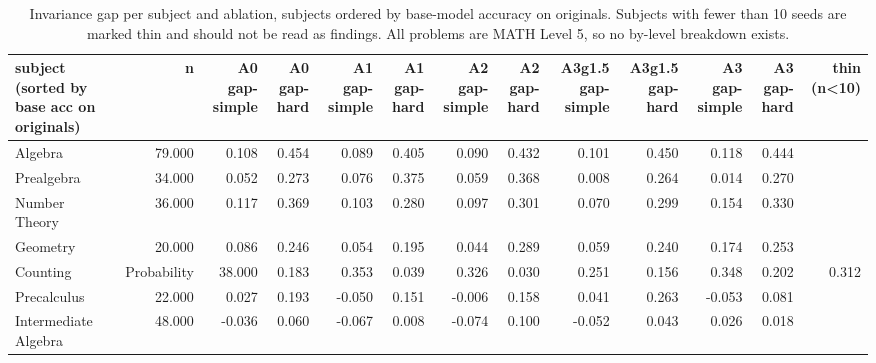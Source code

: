 \begin{table}[t]
\centering
\small
\begin{tabular}{lrrrrrrrrrrrr}
\toprule
subject (sorted by base acc on originals) & n & A0 gap-simple & A0 gap-hard & A1 gap-simple & A1 gap-hard & A2 gap-simple & A2 gap-hard & A3g1.5 gap-simple & A3g1.5 gap-hard & A3 gap-simple & A3 gap-hard & thin (n<10) \\
\midrule
Algebra & 79.000 & 0.108 & 0.454 & 0.089 & 0.405 & 0.090 & 0.432 & 0.101 & 0.450 & 0.118 & 0.444 &  \\
Prealgebra & 34.000 & 0.052 & 0.273 & 0.076 & 0.375 & 0.059 & 0.368 & 0.008 & 0.264 & 0.014 & 0.270 &  \\
Number Theory & 36.000 & 0.117 & 0.369 & 0.103 & 0.280 & 0.097 & 0.301 & 0.070 & 0.299 & 0.154 & 0.330 &  \\
Geometry & 20.000 & 0.086 & 0.246 & 0.054 & 0.195 & 0.044 & 0.289 & 0.059 & 0.240 & 0.174 & 0.253 &  \\
Counting & Probability & 38.000 & 0.183 & 0.353 & 0.039 & 0.326 & 0.030 & 0.251 & 0.156 & 0.348 & 0.202 & 0.312 &  \\
Precalculus & 22.000 & 0.027 & 0.193 & -0.050 & 0.151 & -0.006 & 0.158 & 0.041 & 0.263 & -0.053 & 0.081 &  \\
Intermediate Algebra & 48.000 & -0.036 & 0.060 & -0.067 & 0.008 & -0.074 & 0.100 & -0.052 & 0.043 & 0.026 & 0.018 &  \\
\bottomrule
\end{tabular}
\caption{Invariance gap per subject and ablation, subjects ordered by base-model accuracy on originals. Subjects with fewer than 10 seeds are marked thin and should not be read as findings. All problems are MATH Level 5, so no by-level breakdown exists.}
\label{tab:mp_subject}
\end{table}